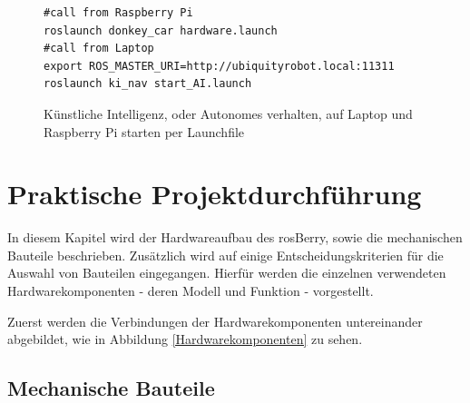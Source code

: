 \documentclass[conference]{IEEEtran}
\begin{document}
	\begin{figure}[h]
		\centering
\begin{verbatim}
#call from Raspberry Pi
roslaunch donkey_car hardware.launch
#call from Laptop
export ROS_MASTER_URI=http://ubiquityrobot.local:11311
roslaunch ki_nav start_AI.launch
		\end{verbatim}
		\label{KI-launch}
		\caption{Künstliche Intelligenz, oder Autonomes verhalten, auf Laptop 
		und Raspberry Pi starten per Launchfile }
	\end{figure}
	
	\section{Praktische Projektdurchführung}
	
	
	In diesem Kapitel wird der Hardwareaufbau des rosBerry, sowie die 
	mechanischen Bauteile beschrieben. Zusätzlich wird auf einige 
	Entscheidungskriterien für die Auswahl von Bauteilen eingegangen. 
	Hierfür werden die einzelnen verwendeten Hardwarekomponenten - deren Modell und Funktion - vorgestellt. 
	
	Zuerst werden die Verbindungen der Hardwarekomponenten untereinander abgebildet, wie in Abbildung \ref{Hardwarekomponenten} zu sehen.
	\subsection{Mechanische Bauteile}
	
\end{document}
